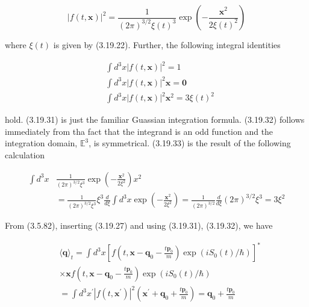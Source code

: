 \documentclass{article}
\begin{document}
\begin{equation*}
|f(t, \boldsymbol{x})|^{2}=\frac{1}{(2 \pi)^{3 / 2} \xi(t)^{3}} \exp \left(-\frac{\boldsymbol{x}^{2}}{2 \xi(t)^{2}}\right) \tag{3.19.30}
\end{equation*}
 
where $\xi(t)$ is given by (3.19.22). Further, the following integral identities
 
\begin{align*}
& \int d^{3} x|f(t, \boldsymbol{x})|^{2}=1  \tag{3.19.31}\\
& \int d^{3} x|f(t, \boldsymbol{x})|^{2} \boldsymbol{x}=\mathbf{0}  \tag{3.19.32}\\
& \int d^{3} x|f(t, \boldsymbol{x})|^{2} \boldsymbol{x}^{2}=3 \xi(t)^{2} \tag{3.19.33}
\end{align*}
 
hold. (3.19.31) is just the familiar Guassian integration formula. (3.19.32) follows immediately from tha fact that the integrand is an odd function and the integration domain, $\mathbb{E}^{3}$, is symmetrical. (3.19.33) is the result of the following calculation
 
\begin{align*}
\int d^{3} x & \frac{1}{(2 \pi)^{3 / 2} \xi^{3}} \exp \left(-\frac{\boldsymbol{x}^{2}}{2 \xi^{2}}\right) x^{2}  \tag{3.19.34}\\
& =\frac{1}{(2 \pi)^{3 / 2} \xi^{3}} \xi^{3} \frac{d}{d \xi} \int d^{3} x \exp \left(-\frac{\boldsymbol{x}^{2}}{2 \xi^{2}}\right)=\frac{1}{(2 \pi)^{3 / 2}} \frac{d}{d \xi}(2 \pi)^{3 / 2} \xi^{3}=3 \xi^{2}
\end{align*}
 

From (3.5.82), inserting (3.19.27) and using (3.19.31), (3.19.32), we have
 
\begin{align*}
&\langle\boldsymbol{q}\rangle_{t}= \int d^{3} x\left[f\left(t, \boldsymbol{x}-\boldsymbol{q}_{0}-\frac{t \boldsymbol{p}_{0}}{m}\right) \exp \left(i S_{0}(t) / \hbar\right)\right]^{*}  \tag{3.19.35}\\
& \times \boldsymbol{x} f\left(t, \boldsymbol{x}-\boldsymbol{q}_{0}-\frac{t \boldsymbol{p}_{0}}{m}\right) \exp \left(i S_{0}(t) / \hbar\right) \\
&=\int d^{3} x^{\prime}\left|f\left(t, \boldsymbol{x}^{\prime}\right)\right|^{2}\left(\boldsymbol{x}^{\prime}+\boldsymbol{q}_{0}+\frac{t \boldsymbol{p}_{0}}{m}\right)=\boldsymbol{q}_{0}+\frac{t \boldsymbol{p}_{0}}{m}
\end{align*}
 
\end{document}
